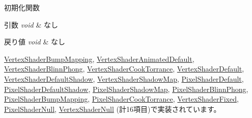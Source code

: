 初期化関数 


\begin{DoxyParams}{引数}
{\em void} & なし \\
\hline
\end{DoxyParams}

\begin{DoxyRetVals}{戻り値}
{\em void} & なし \\
\hline
\end{DoxyRetVals}


\mbox{\hyperlink{class_vertex_shader_bump_mapping_a6c0f59d1f29fd883943a66bfe61b6b03}{Vertex\+Shader\+Bump\+Mapping}}, \mbox{\hyperlink{class_vertex_shader_animated_default_a974cb247b42cb1c9288a9de9ed9048e9}{Vertex\+Shader\+Animated\+Default}}, \mbox{\hyperlink{class_vertex_shader_blinn_phong_a565b15a20d6c73d8b8e0c7dcc3078464}{Vertex\+Shader\+Blinn\+Phong}}, \mbox{\hyperlink{class_vertex_shader_cook_torrance_afab2193c27ca9cdc8490585743cd7ca3}{Vertex\+Shader\+Cook\+Torrance}}, \mbox{\hyperlink{class_vertex_shader_default_afdf5dbbc83e9007fa85ed345e228d304}{Vertex\+Shader\+Default}}, \mbox{\hyperlink{class_vertex_shader_default_shadow_ad0033ccbf57a28ab9879313d3f300338}{Vertex\+Shader\+Default\+Shadow}}, \mbox{\hyperlink{class_vertex_shader_shadow_map_ad05ff60e979b3d2af8603a118cb51185}{Vertex\+Shader\+Shadow\+Map}}, \mbox{\hyperlink{class_pixel_shader_default_a74187e4e936d79947753bf4028a411bf}{Pixel\+Shader\+Default}}, \mbox{\hyperlink{class_pixel_shader_default_shadow_a22be67e887bcad8d9b6725cbae7e3abc}{Pixel\+Shader\+Default\+Shadow}}, \mbox{\hyperlink{class_pixel_shader_shadow_map_a4e68df44391fdd93985ad7b361828f99}{Pixel\+Shader\+Shadow\+Map}}, \mbox{\hyperlink{class_pixel_shader_blinn_phong_af02b6b6659975f0285aebced953c567a}{Pixel\+Shader\+Blinn\+Phong}}, \mbox{\hyperlink{class_pixel_shader_bump_mapping_ab7807b7c56242e965ddb23e66e1a5d9e}{Pixel\+Shader\+Bump\+Mapping}}, \mbox{\hyperlink{class_pixel_shader_cook_torrance_aed6d21d6560d11fede08e596f49716d5}{Pixel\+Shader\+Cook\+Torrance}}, \mbox{\hyperlink{class_vertex_shader_fixed_ae829ff736b33c45543804059255125b6}{Vertex\+Shader\+Fixed}}, \mbox{\hyperlink{class_pixel_shader_null_a5318be2bf26892c385d863e3e8409571}{Pixel\+Shader\+Null}}, \mbox{\hyperlink{class_vertex_shader_null_a4d79b358dab49c840345d74823a16840}{Vertex\+Shader\+Null}} (計16項目)で実装されています。

\mbox{\label{class_shader_base_aaac3419f1fce5bf12973e827daadbf8c}} 
